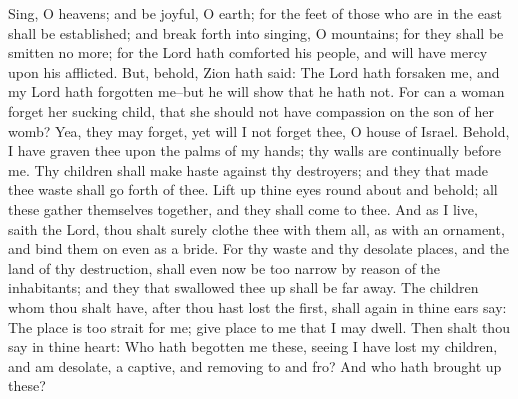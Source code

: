 Sing, O heavens; and be joyful, O earth; for the feet of those who are in the east shall be established; and break forth into singing, O mountains; for they shall be smitten no more; for the Lord hath comforted his people, and will have mercy upon his afflicted.
\bverse \iffalse But, behold, Zion hath said: The Lord hath forsaken me, and my Lord hath forgotten me--but he will show that he hath not. \fi
But, behold, Zion hath said: The Lord hath forsaken me, and my Lord hath forgotten me--but he will show that he hath not.
\bverse \iffalse For can a woman forget her sucking child, that she should not have compassion on the son of her womb? Yea, they may forget, yet will I not forget thee, O house of Israel. \fi
For can a woman forget her sucking child, that she should not have compassion on the son of her womb? Yea, they may forget, yet will I not forget thee, O house of Israel.
\bverse \iffalse Behold, I have graven thee upon the palms of my hands; thy walls are continually before me. \fi
Behold, I have graven thee upon the palms of my hands; thy walls are continually before me.
\bverse \iffalse Thy children shall make haste against thy destroyers; and they that made thee waste shall go forth of thee. \fi
Thy children shall make haste against thy destroyers; and they that made thee waste shall go forth of thee.
\bverse \iffalse Lift up thine eyes round about and behold; all these gather themselves together, and they shall come to thee. And as I live, saith the Lord, thou shalt surely clothe thee with them all, as with an ornament, and bind them on even as a bride. \fi
Lift up thine eyes round about and behold; all these gather themselves together, and they shall come to thee. And as I live, saith the Lord, thou shalt surely clothe thee with them all, as with an ornament, and bind them on even as a bride.
\bverse \iffalse For thy waste and thy desolate places, and the land of thy destruction, shall even now be too narrow by reason of the inhabitants; and they that swallowed thee up shall be far away. \fi
For thy waste and thy desolate places, and the land of thy destruction, shall even now be too narrow by reason of the inhabitants; and they that swallowed thee up shall be far away.
\bverse \iffalse The children whom thou shalt have, after thou hast lost the first, shall again in thine ears say: The place is too strait for me; give place to me that I may dwell. \fi
The children whom thou shalt have, after thou hast lost the first, shall again in thine ears say: The place is too strait for me; give place to me that I may dwell.
\bverse \iffalse Then shalt thou say in thine heart: Who hath begotten me these, seeing I have lost my children, and am desolate, a captive, and removing to and fro? And who hath brought up these? \fi
Then shalt thou say in thine heart: Who hath begotten me these, seeing I have lost my children, and am desolate, a captive, and removing to and fro? And who hath brought up these?

